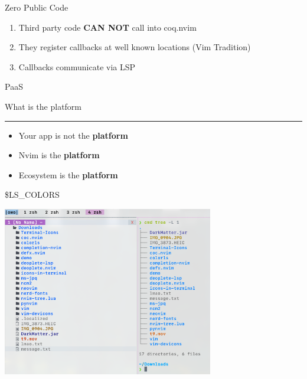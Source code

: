 \documentclass{beamer}
\begin{document}
\begin{frame}{Zero Public Code}

	\begin{enumerate}

		\item Third party code \textbf{CAN NOT} call into coq.nvim

		\item They register callbacks at well known locations (Vim Tradition)

		\item Callbacks communicate via LSP

	\end{enumerate}

\end{frame}


\begin{frame}{PaaS}

	What is the platform

	\rule{\textwidth}{0.1em}

	\begin{itemize}

		\item Your app is not the \textbf{platform}

		\item Nvim is the \textbf{platform}

		\item Ecosystem is the \textbf{platform}

	\end{itemize}

\end{frame}


\begin{frame}{\$LS\_COLORS}

	\includegraphics[width=\textwidth,height=20em]{chadtree_ls}

\end{frame}
\end{document}

